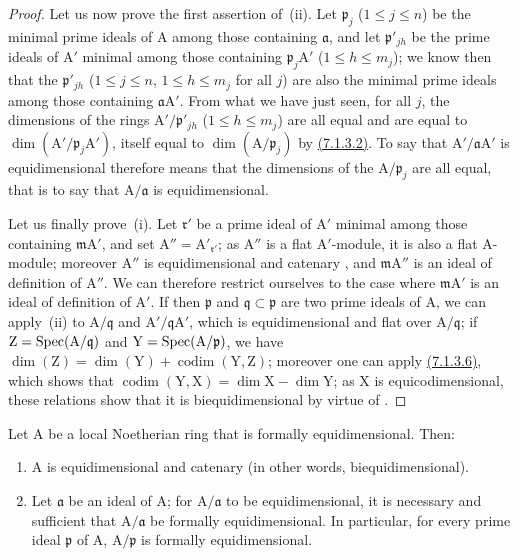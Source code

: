 \begin{proof}
Let us now prove the first assertion of~(ii).
Let $\mathfrak{p}_j$ ($1\leqslant j\leqslant n$) be the minimal prime ideals of $\mathrm{A}$ among those containing $\mathfrak{a}$, and let $\mathfrak{p}'_{jh}$ be the prime ideals of $\mathrm{A}'$ minimal among those containing $\mathfrak{p}_j\mathrm{A}'$ ($1\leqslant h\leqslant m_j$); we know then  that the $\mathfrak{p}'_{jh}$ ($1\leqslant j\leqslant n$, $1\leqslant h\leqslant m_j$ for all $j$) are also the minimal prime ideals among those containing $\mathfrak{a}\mathrm{A}'$.
From what we have just seen, for all $j$, the dimensions of the rings $\mathrm{A}'/\mathfrak{p}'_{jh}$ ($1\leqslant h\leqslant m_j$) are all equal and are equal to $\dim(\mathrm{A}'/\mathfrak{p}_j\mathrm{A}')$, itself equal to $\dim(\mathrm{A}/\mathfrak{p}_j)$ by {\hyperref[IV.7.1.3.2]{(7.1.3.2)}}.
To say that $\mathrm{A}'/\mathfrak{a}\mathrm{A}'$ is equidimensional therefore means that the dimensions of the $\mathrm{A}/\mathfrak{p}_j$ are all equal, that is to say that $\mathrm{A}/\mathfrak{a}$ is equidimensional.

Let us finally prove~(i).
Let $\mathfrak{r}'$ be a prime ideal of $\mathrm{A}'$ minimal among those containing $\mathfrak{m}\mathrm{A}'$, and set $\mathrm{A}''=\mathrm{A}'_{\mathfrak{r}'}$; as $\mathrm{A}''$ is a flat $\mathrm{A}'$-module, it is also a flat $\mathrm{A}$-module; moreover $\mathrm{A}''$ is equidimensional and catenary , and $\mathfrak{m}\mathrm{A}''$ is an ideal of definition of $\mathrm{A}''$.
We can therefore restrict ourselves to the case where $\mathfrak{m}\mathrm{A}'$ is an ideal of definition of $\mathrm{A}'$.
If then $\mathfrak{p}$ and $\mathfrak{q}\subset\mathfrak{p}$ are two prime ideals of $\mathrm{A}$, we can apply~(ii) to $\mathrm{A}/\mathfrak{q}$ and $\mathrm{A}'/\mathfrak{q}\mathrm{A}'$, which is equidimensional and flat over $\mathrm{A}/\mathfrak{q}$; if $\mathrm{Z}=\operatorname{Spec}(\mathrm{A}/\mathfrak{q})$ and $\mathrm{Y}=\operatorname{Spec}(\mathrm{A}/\mathfrak{p})$, we have
$\dim(\mathrm{Z})=\dim(\mathrm{Y})+\operatorname{codim}(\mathrm{Y},\mathrm{Z})$;
moreover one can apply {\hyperref[IV.7.1.3.6]{(7.1.3.6)}}, which shows that $\operatorname{codim}(\mathrm{Y},\mathrm{X})=\dim\mathrm{X}-\dim\mathrm{Y}$; as $\mathrm{X}$ is equicodimensional, these relations show that it is biequidimensional by virtue of .
\end{proof}

\begin{corollary}[7.1.4]
\label{IV.7.1.4}
Let $\mathrm{A}$ be a local Noetherian ring that is formally equidimensional.
Then:
\begin{enumerate}[label=\emph{\roman*)}]
  \item $\mathrm{A}$ is equidimensional and catenary (in other words, biequidimensional).
  \item Let $\mathfrak{a}$ be an ideal of $\mathrm{A}$; for $\mathrm{A}/\mathfrak{a}$ to be equidimensional, it is necessary and sufficient that $\mathrm{A}/\mathfrak{a}$ be formally equidimensional.
  In particular, for every prime ideal $\mathfrak{p}$ of $\mathrm{A}$, $\mathrm{A}/\mathfrak{p}$ is formally equidimensional.
\end{enumerate}
\end{corollary}

